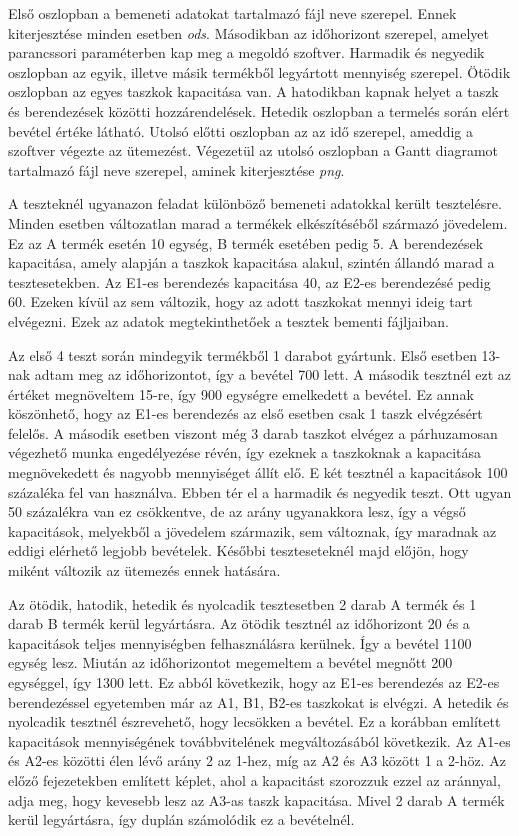 Első oszlopban a bemeneti adatokat tartalmazó fájl neve szerepel. Ennek kiterjesztése minden esetben \textit{ods}. Másodikban az időhorizont szerepel, amelyet parancssori paraméterben kap meg a megoldó szoftver. Harmadik és negyedik oszlopban az egyik, illetve másik termékből legyártott mennyiség szerepel. Ötödik oszlopban az egyes taszkok kapacitása van. A hatodikban kapnak helyet a taszk és berendezések közötti hozzárendelések. Hetedik oszlopban a termelés során elért bevétel értéke látható. Utolsó előtti oszlopban az az idő szerepel, ameddig a szoftver végezte az ütemezést. Végezetül az utolsó oszlopban a Gantt diagramot tartalmazó fájl neve szerepel, aminek kiterjesztése \textit{png}.

A teszteknél ugyanazon feladat különböző bemeneti adatokkal került tesztelésre. Minden esetben változatlan marad a termékek elkészítéséből származó jövedelem. Ez az A termék esetén 10 egység, B termék esetében pedig 5. A berendezések kapacitása, amely alapján a taszkok kapacitása alakul, szintén állandó marad a tesztesetekben. Az E1-es berendezés kapacitása 40, az E2-es berendezésé pedig 60. Ezeken kívül az sem változik, hogy az adott taszkokat mennyi ideig tart elvégezni. Ezek az adatok megtekinthetőek a tesztek bementi fájljaiban.

Az első 4 teszt során mindegyik termékből 1 darabot gyártunk. Első esetben 13-nak adtam meg az időhorizontot, így a bevétel 700 lett. A második tesztnél ezt az értéket megnöveltem 15-re, így 900 egységre emelkedett a bevétel. Ez annak köszönhető, hogy az E1-es berendezés az első esetben csak 1 taszk elvégzésért felelős. A második esetben viszont még 3 darab taszkot elvégez a párhuzamosan végezhető munka engedélyezése révén, így ezeknek a  taszkoknak a kapacitása megnövekedett és nagyobb mennyiséget állít elő. E két tesztnél a kapacitások 100 százaléka fel van használva. Ebben tér el a harmadik és negyedik teszt. Ott ugyan 50 százalékra van ez csökkentve, de az arány ugyanakkora lesz, így a végső kapacitások, melyekből a jövedelem származik, sem változnak, így maradnak az eddigi elérhető legjobb bevételek. Későbbi teszteseteknél majd előjön, hogy miként változik az ütemezés ennek hatására.

Az ötödik, hatodik, hetedik és nyolcadik tesztesetben 2 darab A termék és 1 darab B termék kerül legyártásra. Az ötödik tesztnél az időhorizont 20 és a kapacitások teljes mennyiségben felhasználásra kerülnek. Így a bevétel 1100 egység lesz. Miután az időhorizontot megemeltem a bevétel megnőtt 200 egységgel, így 1300 lett. Ez abból következik, hogy az E1-es berendezés az E2-es berendezéssel egyetemben már az A1, B1, B2-es taszkokat is elvégzi. A hetedik és nyolcadik tesztnél észrevehető, hogy lecsökken a bevétel. Ez a korábban említett kapacitások mennyiségének továbbvitelének megváltozásából következik. Az A1-es és A2-es közötti élen lévő arány 2 az 1-hez, míg az A2 és A3 között 1 a 2-höz. Az előző fejezetekben említett képlet, ahol a kapacitást szorozzuk ezzel az aránnyal, adja meg, hogy kevesebb lesz az A3-as taszk kapacitása. Mivel 2 darab A termék kerül legyártásra, így duplán számolódik ez a bevételnél. 

